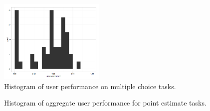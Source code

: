 \documentclass[12pt]{article}
\begin{document}
\begin{figure}[ht!]
\begin{center}
\includegraphics[width=0.45\textwidth]{../../output/demo_analysis/hist_user_perf_mc.png}
\caption{Histogram of user performance on multiple choice tasks.}
\end{center}	
\end{figure}


\begin{figure}[ht!]
     \begin{center}
    \end{center}
    \caption{Histogram of aggregate user performance for point estimate tasks.}
\end{figure}
\end{document}
